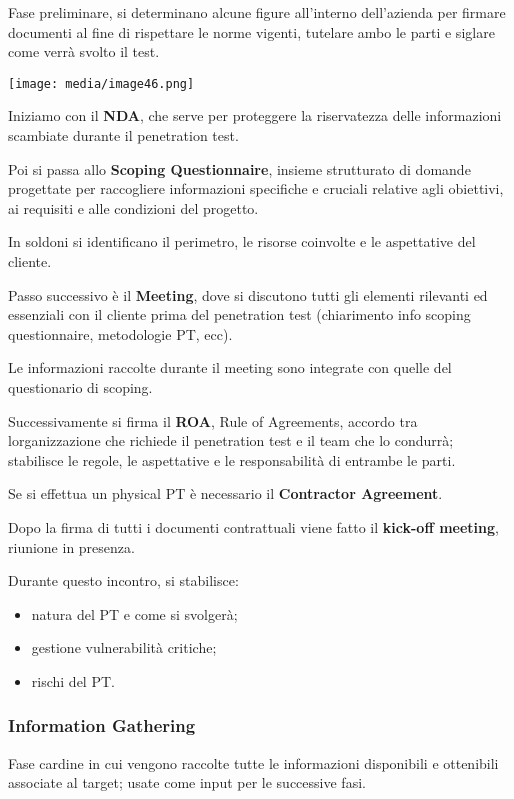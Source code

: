 Fase preliminare, si determinano alcune figure all'interno dell'azienda
per firmare documenti al fine di rispettare le norme vigenti, tutelare
ambo le parti e siglare come verrà svolto il test.

\texttt{[image: media/image46.png]}

Iniziamo con il \textbf{NDA}, che serve per proteggere la riservatezza
delle informazioni scambiate durante il penetration test.

Poi si passa allo \textbf{Scoping Questionnaire}, insieme strutturato di
domande progettate per raccogliere informazioni specifiche e cruciali
relative agli obiettivi, ai requisiti e alle condizioni del progetto.

In soldoni si identificano il perimetro, le risorse coinvolte e le
aspettative del cliente.

Passo successivo è il \textbf{Meeting}, dove si discutono tutti gli
elementi rilevanti ed essenziali con il cliente prima del penetration
test (chiarimento info scoping questionnaire, metodologie PT, ecc).

Le informazioni raccolte durante il meeting sono integrate con quelle
del questionario di scoping.

Successivamente si firma il \textbf{ROA}, Rule of Agreements, accordo
tra l\textquotesingle organizzazione che richiede il penetration test e
il team che lo condurrà; stabilisce le regole, le aspettative e le
responsabilità di entrambe le parti.

Se si effettua un physical PT è necessario il \textbf{Contractor
Agreement}.

Dopo la firma di tutti i documenti contrattuali viene fatto il
\textbf{kick-off meeting}, riunione in presenza.

Durante questo incontro, si stabilisce:

\begin{itemize}
\item
  natura del PT e come si svolgerà;
\item
  gestione vulnerabilità critiche;
\item
  rischi del PT.
\end{itemize}

\subsubsection{Information Gathering}\label{information-gathering}

Fase cardine in cui vengono raccolte tutte le informazioni disponibili e
ottenibili associate al target; usate come input per le successive fasi.


